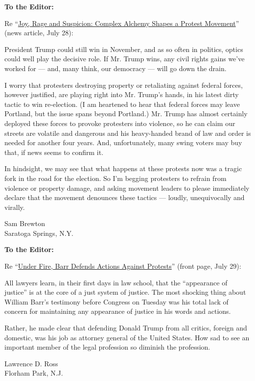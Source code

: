 \textbf{To the Editor:}

Re
``\href{https://www.nytimes3xbfgragh.onion/2020/07/27/us/protests-divisions-blm.html}{Joy,
Rage and Suspicion: Complex Alchemy Shapes a Protest Movement}'' (news
article, July 28):

President Trump could still win in November, and as so often in
politics, optics could well play the decisive role. If Mr. Trump wins,
any civil rights gains we've worked for --- and, many think, our
democracy --- will go down the drain.

I worry that protesters destroying property or retaliating against
federal forces, however justified, are playing right into Mr. Trump's
hands, in his latest dirty tactic to win re-election. (I am heartened to
hear that federal forces may leave Portland, but the issue spans beyond
Portland.) Mr. Trump has almost certainly deployed these forces to
provoke protesters into violence, so he can claim our streets are
volatile and dangerous and his heavy-handed brand of law and order is
needed for another four years. And, unfortunately, many swing voters may
buy that, if news seems to confirm it.

In hindsight, we may see that what happens at these protests now was a
tragic fork in the road for the election. So I'm begging protesters to
refrain from violence or property damage, and asking movement leaders to
please immediately declare that the movement denounces these tactics ---
loudly, unequivocally and virally.

Sam Brewton\\
Saratoga Springs, N.Y.

\textbf{To the Editor:}

Re
``\href{https://www.nytimes3xbfgragh.onion/2020/07/28/us/politics/barr-testimony.html}{Under
Fire, Barr Defends Actions Against Protests}'' (front page, July 29):

All lawyers learn, in their first days in law school, that the
``appearance of justice'' is at the core of a just system of justice.
The most shocking thing about William Barr's testimony before Congress
on Tuesday was his total lack of concern for maintaining any appearance
of justice in his words and actions.

Rather, he made clear that defending Donald Trump from all critics,
foreign and domestic, was his job as attorney general of the United
States. How sad to see an important member of the legal profession so
diminish the profession.

Lawrence D. Ross\\
Florham Park, N.J.

